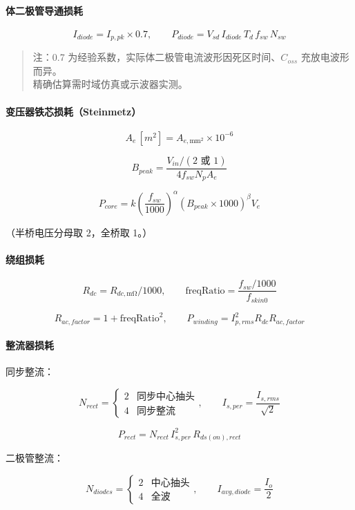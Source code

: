 \documentclass[UTF8]{ctexart}
\begin{document}
\paragraph{体二极管导通损耗}

\[
I_{diode} = I_{p,pk} \times 0.7,\qquad
P_{diode} = V_{sd} \, I_{diode} \, T_d \, f_{sw} \, N_{sw}
\]

\begin{quote}
注：0.7 为经验系数，实际体二极管电流波形因死区时间、\( C_{oss} \) 充放电波形而异。\\
精确估算需时域仿真或示波器实测。
\end{quote}

\paragraph{变压器铁芯损耗（Steinmetz）}

\[
A_e\,[m^{2}] = A_{e,\text{mm}^{2}} \times 10^{-6}
\]

\[
B_{peak} = \frac{V_{in} / (2\text{ 或 }1)}{4 f_{sw} N_p A_e}
\]

\[
P_{core} = k \left(\frac{f_{sw}}{1000}\right)^{\alpha} \left(B_{peak} \times 1000\right)^{\beta} V_e
\]

（半桥电压分母取 2，全桥取 1。）

\paragraph{绕组损耗}

\[
R_{dc} = R_{dc,\text{mΩ}} / 1000,\qquad
\text{freqRatio} = \frac{f_{sw}/1000}{f_{skin0}}
\]

\[
R_{ac,factor} = 1 + \text{freqRatio}^{2},\qquad
P_{winding} = I_{p,rms}^{2} R_{dc} R_{ac,factor}
\]

\paragraph{整流器损耗}

同步整流：

\[
N_{rect} = \begin{cases} 2 & \text{同步中心抽头} \\ 4 & \text{同步整流} \end{cases},\qquad
I_{s,per} = \frac{I_{s,rms}}{\sqrt{2}}
\]

\[
P_{rect} = N_{rect} \, I_{s,per}^{2} \, R_{ds(on),rect}
\]

二极管整流：

\[
N_{diodes} = \begin{cases} 2 & \text{中心抽头} \\ 4 & \text{全波} \end{cases},\qquad
I_{avg,diode} = \frac{I_o}{2}
\]
\end{document}

